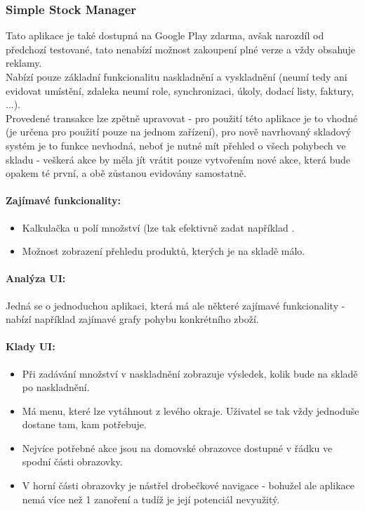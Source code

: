 
\subsubsection{Simple Stock Manager}

Tato aplikace je také dostupná na Google Play zdarma, avšak narozdíl od předchozí testované, tato nenabízí možnost zakoupení plné verze a vždy obsahuje reklamy.\\
Nabízí pouze základní funkcionalitu naskladnění a vyskladnění (neumí tedy ani evidovat umístění, zdaleka neumí role, synchronizaci, úkoly, dodací listy, faktury, ...).\\
Provedené transakce lze zpětně upravovat - pro použití této aplikace je to vhodné (je určena pro použití pouze na jednom zařízení), pro nově navrhovaný skladový systém je to funkce nevhodná, neboť je nutné mít přehled o všech pohybech ve skladu - veškerá akce by měla jít vrátit pouze vytvořením nové akce, která bude opakem té první, a obě zůstanou evidovány samostatně.

\paragraph{Zajímavé funkcionality:}
\begin{itemize}
	\item Kalkulačka u polí množství (lze tak efektivně zadat například .
	\item Možnost zobrazení přehledu produktů, kterých je na skladě málo.
\end{itemize}

\paragraph{Analýza UI:} Jedná se o jednoduchou aplikaci, která má ale některé zajímavé funkcionality - nabízí například zajímavé grafy pohybu konkrétního zboží.

\paragraph{Klady UI:}
\begin{itemize}
	\item Při zadávání množství v naskladnění zobrazuje výsledek, kolik bude na skladě po naskladnění.
	\item Má menu, které lze vytáhnout z levého okraje. Uživatel se tak vždy jednoduše dostane tam, kam potřebuje.
	\item Nejvíce potřebné akce jsou na domovské obrazovce dostupné v řádku ve spodní části obrazovky.
	\item V horní části obrazovky je nástřel drobečkové navigace - bohužel ale aplikace nemá více než 1 zanoření a tudíž je její potenciál nevyužitý.
\end{itemize}

